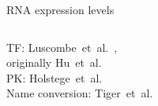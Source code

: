 \begin{frame}{RNA expression levels}
\label{sec:yeast_data}
\begin{columns}
\begin{column}{0.3\textwidth}

\small
TF: Luscombe~et~al.~\cite{Luscombe2010}, \\ originally Hu~et~al.~\cite{Hu2007} \\
PK: Holstege~et~al.~\cite{Holstege2010} \\
Name conversion: Tiger~et~al.~\cite{Tiger2012}
\normalsize


\end{column}
\end{columns}
\end{frame}
